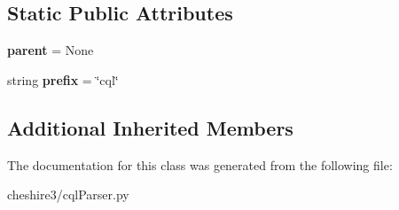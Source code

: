 \subsection*{Static Public Attributes}
\begin{DoxyCompactItemize}
\item 
\hypertarget{classcheshire3_1_1cql_parser_1_1_modifier_type_a7c210f8a1cf69d8f21ce35b48579744f}{{\bfseries parent} = None}\label{classcheshire3_1_1cql_parser_1_1_modifier_type_a7c210f8a1cf69d8f21ce35b48579744f}

\item 
\hypertarget{classcheshire3_1_1cql_parser_1_1_modifier_type_a0c69a13024a47bfa2a701f1b5b15a37d}{string {\bfseries prefix} = \char`\"{}cql\char`\"{}}\label{classcheshire3_1_1cql_parser_1_1_modifier_type_a0c69a13024a47bfa2a701f1b5b15a37d}

\end{DoxyCompactItemize}
\subsection*{Additional Inherited Members}


The documentation for this class was generated from the following file\-:\begin{DoxyCompactItemize}
\item 
cheshire3/cql\-Parser.\-py\end{DoxyCompactItemize}
